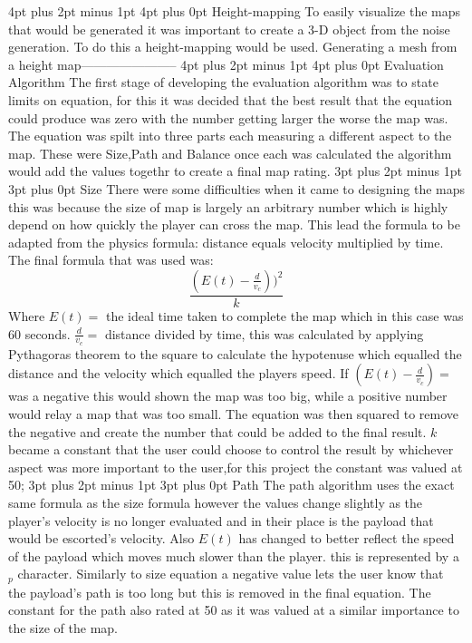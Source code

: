 \documentclass[12pt,a4paper,oneside]{book}
\makeatletter
\renewcommand\subsection{\@startsection {subsection}{1}{2mm} %
                               {3pt plus 2pt minus 1pt} %
                               {3pt plus 0pt} %
                               {\normalfont\bfseries}}
\renewcommand\section{\@startsection {section}{1}{0mm} %
                               {4pt plus 2pt minus 1pt} %
                               {4pt plus 0pt} %
                               {\bfseries}}
\makeatother
\begin{document}
\section{Height-mapping}
To easily visualize the maps that would be generated it was important to create a 3-D object from the noise generation. To do this a height-mapping would be used. Generating a mesh from a height map-----------------------  
\section{Evaluation Algorithm}
The first  stage of developing the evaluation algorithm was to state limits on equation, for this it was decided that the best result that the equation could produce was zero with the number getting larger the worse the map was. The equation was spilt into three parts each measuring a different aspect to the map. These were Size,Path and Balance once each was calculated the algorithm would add the values togethr to create a final map rating.   
\subsection{Size}
There were some difficulties when it came to designing the maps this was because the size of map is largely an arbitrary number which is highly depend on how quickly the player can cross the map. This lead the formula to be adapted from the physics formula: distance equals velocity multiplied by time. The final formula that was used was:  
\begin{equation}
\frac{(E(t)  - \frac{d}{v_c}))^2}{k}
\end{equation} 
Where  \(E(t) =\) the ideal time taken to complete the map which in this case was 60 seconds.
 \(\frac{d}{v_c}  =\) distance divided by time, this was calculated by applying Pythagoras theorem to the square to calculate the hypotenuse which equalled the distance and the velocity which equalled the players speed. If \((E(t)  - \frac{d}{v_c}) =\) was a negative this would shown the map was too big, while a positive number would relay a map that was too small. The equation was then squared to remove the negative and create the number that could be added to the final result. \(k \) became a constant that the user could choose to control the result by whichever aspect was more important to the user,for this project the constant was valued at 50;
\subsection{Path}
The path algorithm uses the exact same formula as the size formula however the values change slightly as the player's velocity is no longer evaluated and in their place is the payload that would be escorted's velocity. Also \(E(t) \) has changed to better reflect the speed of the payload which moves much slower than the player. this is represented by a \(_p \) character. Similarly to size equation a negative value lets the user know that the payload's path is too long but this is removed in the final equation. The constant for the path also rated at 50 as it was valued at a similar importance to the size of the map.  
\end{document}
